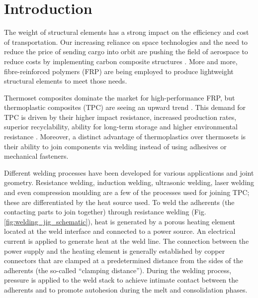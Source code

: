 \documentclass[11pt,review,times]{elsarticle}
\begin{document}
							\section{Introduction}

The weight of structural elements has a strong impact on the efficiency and cost of transportation. 
Our increasing reliance on space technologies and the need to reduce the price of sending cargo into orbit are pushing the field of aerospace to reduce costs by implementing carbon composite structures \cite{Williams2003,Timmis2015}. 
More and more, fibre-reinforced polymers (FRP) are being employed to produce lightweight structural elements to meet those needs. 

Thermoset composites dominate the market for high-performance FRP, but thermoplastic composites (TPC) are seeing an upward trend \cite{CompositeWorldSloan2018}. 
This demand for TPC is driven by their higher impact resistance, increased production rates, superior recyclability, ability for long-term storage and higher environmental resistance \cite{cogswell1992}. 
Moreover, a distinct advantage of thermoplastics over thermosets is their ability to join components via welding instead of using adhesives or mechanical fasteners. 

Different welding processes have been developed for various applications and joint geometry. 
Resistance welding, induction welding, ultrasonic welding, laser welding and even compression moulding are a few of the processes used for joining TPC; these are differentiated by the heat source used. 
To weld the adherents (the contacting parts to join together) through resistance welding (Fig. \ref{fig:welding_jig_schematic}), heat is generated by a porous heating element located at the weld interface and connected to a power source. 
An electrical current is applied to generate heat at the weld line. 
The connection between the power supply and the heating element is generally established by copper connectors that are clamped at a predetermined distance from the sides of the adherents (the so-called “clamping distance”). 
During the welding process, pressure is applied to the weld stack to achieve intimate contact between the adherents and to promote autohesion during the melt and consolidation phases. 
\end{document}
